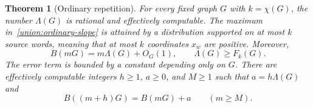 \documentclass[11pt,reqno]{amsart}
\numberwithin{equation}{section}
\newtheorem{theorem}{Theorem}[section]
\theoremstyle{definition}
\theoremstyle{remark}
\begin{document}
\begin{theorem}[Ordinary repetition]\label{union:ordinary-repetition}
For every fixed graph $G$ with $k=\chi(G)$, the number $\Lambda(G)$
is rational and effectively computable. The maximum
in~\eqref{union:ordinary-slope} is attained by a distribution supported
on at most $k$ source words, meaning that at most $k$ coordinates
$x_w$ are positive. Moreover,
\begin{equation}\label{union:ordinary-linear-growth}
B(mG)=m\Lambda(G)+O_G(1),\qquad \Lambda(G)\ge F_k(G).
\end{equation}
The error term is bounded by a constant depending only on $G$.
There are effectively computable integers $h\ge1$, $a\ge0$, and
$M\ge1$ such that $a=h\Lambda(G)$ and
\begin{equation}\label{union:ordinary-eventual-recurrence}
 B((m+h)G)=B(mG)+a\qquad(m\ge M).
\end{equation}
\end{theorem}
\end{document}
